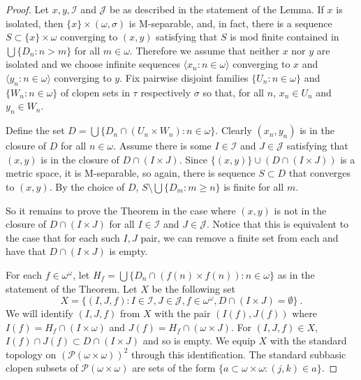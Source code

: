 \documentclass{amsart}
\theoremstyle{definition}
\theoremstyle{remark}
\begin{document}
\begin{proof}
Let $x,y,\mathcal I$ and $\mathcal J$ be as described in the statement
of the Lemma.  If $x$ is isolated, then $\{x\}\times (\omega,\sigma)$ is M-separable,
and, in fact, there is a sequence $S\subset \{x\}\times \omega$ converging
to $(x,y)$ satisfying that $S$ is mod finite contained in 
 $\bigcup\{ D_n : n > m\}$ for all $m\in \omega$.
 Therefore we assume that neither $x$ nor $y$ are isolated and we
 choose infinite sequences $\langle x_n :n\in\omega\rangle$ converging
 to $x$ and $\langle y_n : n\in\omega\rangle$ converging to $y$.
 Fix pairwise disjoint families $\{U_n :n\in\omega\}$ 
 and $\{ W_n : n\in\omega\}$ of clopen sets in $\tau$ respectively $\sigma$
 so that, for all $n$, $x_n\in U_n$ and $y_n\in W_n$.

 Define the set $D = \bigcup \{ D_n \cap (U_n\times W_n) : n\in \omega\}$.
  Clearly $(x_n,y_n)$ is in the closure of $D$ for all $n\in\omega$.
  Assume there is some  $I\in \mathcal I$ and $J\in \mathcal J$
  satisfying that $(x,y)$ is in the closure of $D\cap (I\times J)$. 
  Since $\{(x,y)\}\cup \left(D\cap (I\times J)\right)$ is a metric
  space, it is M-separable, so again, there is sequence $S\subset D$
  that converges to $(x,y)$. By the choice of $D$, 
   $S\setminus \bigcup\{ D_m : m\geq n\}$ is finite for all $m$.

   So it remains to prove the Theorem in the case where
   $(x,y)$ is not in the closure of $D\cap (I\times J)$ for all $I\in 
   \mathcal I$ and $J\in \mathcal J$. Notice that this is equivalent
   to the case that for each such $I,J$ pair, we can remove a finite
   set from each and have that $D\cap (I\times J)$ is empty. 

  For each $f\in \omega^\omega$, let $H_f = \bigcup\{ D_n \cap (f(n)\times f(n)) : n\in\omega\}$
  as in the statement of the Theorem.
   Let $X$ be the following set
   $$ X = \{ (I,J,f) : I\in\mathcal I, J\in \mathcal J, f\in \omega^{\omega},
    D\cap (I\times J)=\emptyset\}~.$$
    We will identify $(I,J,f)$ from $X$ with the pair
     $(I(f), J(f))$ where
      $I(f) = H_f \cap (I\times \omega)$ and
       $J(f)= H_f\cap (\omega \times J)$. 
    For $(I,J,f)\in X$, $I(f)\cap J(f) \subset
        D\cap (I\times J)$ and so is empty.
We equip $X$ with the standard   topology on $(\mathcal P(\omega\times\omega))^2$
through this identification.     
The standard subbasic clopen subsets of $\mathcal P(\omega\times\omega)$
are sets of the form $\{ a\subset \omega\times\omega : (j,k)\in a\}$. 


\end{proof}
\end{document}
